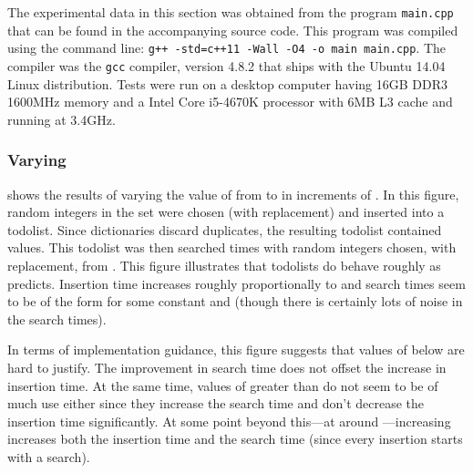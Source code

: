 \documentclass{patmorin}
\begin{document}
The experimental data in this section was obtained from the program
\texttt{main.cpp} that can be found in the accompanying source code.
This program was compiled using the command line: \texttt{g++ -std=c++11 -Wall -O4 -o main main.cpp}. The compiler was the \texttt{gcc} compiler, version
4.8.2 that ships with the Ubuntu 14.04 Linux distribution.  Tests were
run on a desktop computer having 16GB DDR3 1600MHz memory and a Intel
Core i5-4670K processor with 6MB L3 cache and running at 3.4GHz.

\subsubsection{Varying }

 shows the results of varying the value of  from
 to  in increments of . In this figure, 
random integers in the set  were chosen
(with replacement) and inserted into a todolist. Since dictionaries
discard duplicates, the resulting todolist contained  values.
This todolist was then searched  times with random integers chosen,
with replacement, from .  This figure illustrates
that todolists do behave roughly as  predicts.
Insertion time increases roughly proportionally to  and search
times seem to be of the form  for some constant  and 
(though there is certainly lots of noise in the search times).

In terms of implementation guidance, this figure suggests that values
of  below  are hard to justify.  The improvement in search
time does not offset the increase in insertion time.  At the same
time, values of  greater than  do not seem to be of much
use either since they increase the search time and don't decrease the
insertion time significantly. At some point beyond this---at around
---increasing  increases both the insertion time and
the search time (since every insertion starts with a search).
\end{document}
